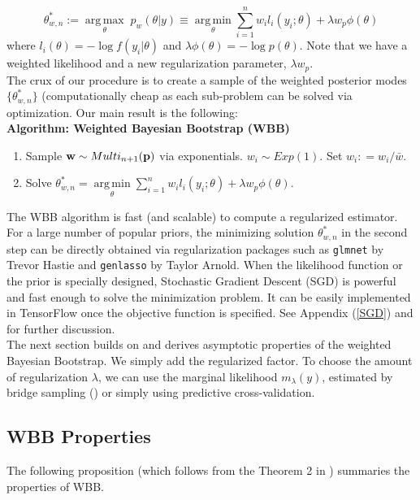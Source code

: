 \documentclass[11pt]{article}%
\newcommand{\defeq}{\mathrel{\mathop:}=}
\DeclareMathOperator*{\argmax}{arg\,max}
\DeclareMathOperator*{\argmin}{arg\,min} %
\begin{document}
$$
\theta^*_{w,n} := \underset{\theta}{\argmax} \; p_w(\theta | y) \equiv \underset{\theta}{\argmin} \sum_{i=1}^n w_i l_i(y_i; \theta) + \lambda w_{p} \phi(\theta)
$$
where $l_i(\theta) = -\log f(y_i|\theta)$ and $ \lambda\phi(\theta) = -\log p(\theta)$. Note that we have a weighted likelihood and a new regularization parameter, $\lambda w_p$.\\

\noindent
\noindent  The crux of our procedure is to create a sample of the weighted posterior modes $\{ \theta_{w,n}^*\}$ (computationally cheap as each sub-problem can be solved via optimization. Our main result is the following:\\

\noindent \textbf{Algorithm: Weighted Bayesian Bootstrap (WBB)}
\begin{enumerate}
\item Sample ${\bf{w}} \sim Multi_{n+1} ( {\bf{p}})$ via exponentials. $w_i \sim Exp(1)$. Set $w_i \defeq w_i /\bar{w} $.

\item Solve $\theta^*_{w,n} = \underset{\theta}{\argmin} \sum_{i=1}^n w_i l_i(y_i; \theta) +  \lambda w_p \phi(\theta)$. 
\end{enumerate}

\noindent The WBB algorithm is fast (and scalable) to compute a regularized estimator. For a large number of popular priors, the minimizing solution $\theta^*_{w,n}$ in the second step can be directly obtained via regularization packages such as {\tt glmnet} by Trevor Hastie and {\tt genlasso} by Taylor Arnold. When the likelihood function or the prior is specially designed, Stochastic Gradient Descent (SGD) is powerful and fast enough to solve the minimization problem. It can be easily implemented in TensorFlow once the objective function is specified. See Appendix (\ref{SGD}) and \cite{polson2017deep} for further discussion. \\

\noindent  The next section builds on \cite{newton1991approximate, newton1994approximate} and derives asymptotic properties of the weighted Bayesian Bootstrap. We simply add the regularized factor. To choose the amount of regularization $\lambda$, we can use the marginal likelihood $m_\lambda (y)$, estimated by bridge sampling (\cite{gelman1998simulating}) or simply using predictive cross-validation.\\

\subsection{WBB Properties}
\noindent The following proposition (which follows from the Theorem 2 in \cite{newton1994approximate}) summaries the properties of WBB.\\
\end{document}
